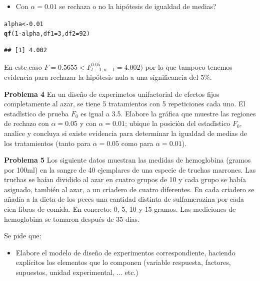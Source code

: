 \documentclass[a4paper]{scrartcl}\usepackage[]{graphicx}\usepackage[]{color}
\makeatletter
\newcommand{\hlnum}[1]{\textcolor[rgb]{0.686,0.059,0.569}{#1}}%
\newcommand{\hlopt}[1]{\textcolor[rgb]{0,0,0}{#1}}%
\newcommand{\hlstd}[1]{\textcolor[rgb]{0.345,0.345,0.345}{#1}}%
\newcommand{\hlkwb}[1]{\textcolor[rgb]{0.69,0.353,0.396}{#1}}%
\newcommand{\hlkwc}[1]{\textcolor[rgb]{0.333,0.667,0.333}{#1}}%
\newcommand{\hlkwd}[1]{\textcolor[rgb]{0.737,0.353,0.396}{\textbf{#1}}}%
\newenvironment{kframe}{%
 \def\at@end@of@kframe{}%
 \ifinner\ifhmode%
  \def\at@end@of@kframe{\end{minipage}}%
  \begin{minipage}{\columnwidth}%
 \fi\fi%
 \def\FrameCommand##1{\hskip\@totalleftmargin \hskip-\fboxsep
 \colorbox{shadecolor}{##1}\hskip-\fboxsep
     \hskip-\linewidth \hskip-\@totalleftmargin \hskip\columnwidth}%
 \MakeFramed {\advance\hsize-\width
   \@totalleftmargin\z@ \linewidth\hsize
   \@setminipage}}%
 {\par\unskip\endMakeFramed%
 \at@end@of@kframe}
\newenvironment{knitrout}{}{} %
\makeatother
\begin{document}
\begin{itemize}
  \item Con $\alpha = 0.01$ se rechaza o no la hipótesis de igualdad de medias?
\end{itemize}
\begin{knitrout}
\color{fgcolor}\begin{kframe}
\begin{alltt}
\hlstd{alpha} \hlkwb{<-} \hlnum{0.01}
\hlkwd{qf}\hlstd{(}\hlnum{1} \hlopt{-} \hlstd{alpha,} \hlkwc{df1}\hlstd{=} \hlnum{3}\hlstd{,} \hlkwc{df2} \hlstd{=} \hlnum{92}\hlstd{)}
\end{alltt}
\begin{verbatim}
## [1] 4.002
\end{verbatim}
\end{kframe}
\end{knitrout}
En este caso $F = 0.5655 < F_{t-1, n-t}^{0.05} = 4.002)$ por lo que tampoco tenemos evidencia para rechazar la hipótesis nula a una significancia del $5\%$.

\newpage
\textbf{Problema 4}
En un diseño de experimetos unifactorial de efectos fijos completamente al azar, se tiene 5 tratamientos con 5 repeticiones cada uno. El estadìstico de prueba $F_0$ es igual a 3.5. Elabore la gráfica que muestre las regiones de rechazo con $\alpha = 0.05$ y con $\alpha = 0.01$; ubique la posiciòn del estadìstico $F_0$, analice y concluya si existe evidencia para determinar la igualdad de medias de los tratamientos (tanto para $\alpha = 0.05$ como para $\alpha = 0.01$).

\newpage
\textbf{Problema 5}
Los siguiente datos muestran las medidas de hemoglobina (gramos por 100ml) en la sangre de 40 ejemplares de una especie de truchas marrones. Las truchas se haían dividido al azar en cuatro grupos de 10 y cada grupo se había asignado, también al azar, a un criadero de cuatro diferentes. En cada criadero se añadía a la dieta de los peces una cantidad distinta de sulfamerazina por cada cien libras de comida. En concreto: 0, 5, 10 y 15 gramos. Las mediciones de hemoglobina se tomaron después de 35 días.

Se pide que:

\begin{itemize}
  \item Elabore el modelo de diseño de experimentos correspondiente, haciendo explícitos los elementos que lo componen (variable respuesta, factores, supuestos, unidad experimental, ... etc.)
\end{itemize}
\end{document}

